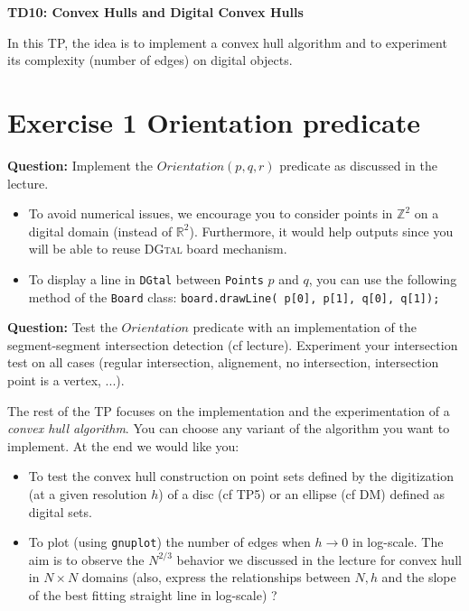 \documentclass[a4paper, 11pt]{article}
\title{}
\author{}
\date{}
\begin{document}
\begin{center}
	\LARGE \textbf{TD10: Convex Hulls and Digital Convex Hulls}
\end{center}

\bigskip
\par In this TP, the idea is to implement a convex hull algorithm and to experiment its complexity (number of edges) on digital objects.

\section*{Exercise 1 \rm Orientation predicate}

{\bf Question:} Implement the $Orientation(p,q,r)$ predicate as discussed in the lecture.
	\begin{itemize}
	\item To avoid numerical issues, we encourage you to consider points in $\mathbb{Z}^2$ on a digital domain (instead of $\mathbb{R}^2$). Furthermore, it would help outputs since you will be able to reuse \textsc{DGtal} board mechanism.
	\item To display a line in \texttt{DGtal} between \texttt{Points} $p$ and $q$, you can use the following method of the \texttt{Board} class: \texttt{board.drawLine( p[0], p[1], q[0], q[1]);}
	\end{itemize}

{\bf Question:} Test the $Orientation$ predicate with an implementation of the segment-segment intersection detection (cf lecture). Experiment your intersection test on all cases (regular intersection, alignement, no intersection, intersection point is a vertex, ...).


\bigskip
\bigskip
\bigskip

\par The rest of the TP focuses on the implementation and the experimentation of a \emph{convex hull algorithm}. You can choose any variant of the algorithm you want to implement. At the end we would like you:
	\begin{itemize}
	\item To test the convex hull construction on point sets defined by the digitization (at a given resolution $h$) of a disc (cf TP5) or an ellipse (cf DM) defined as digital sets.
	\item To plot (using \texttt{gnuplot}) the number of edges when $h\rightarrow 0$ in log-scale. The aim is to observe the $N^{2/3}$ behavior we discussed in the lecture for convex hull in $N\times N$ domains (also, express the relationships between $N, h$ and the slope of the best fitting straight line in log-scale) ?
	\end{itemize}
\end{document}
